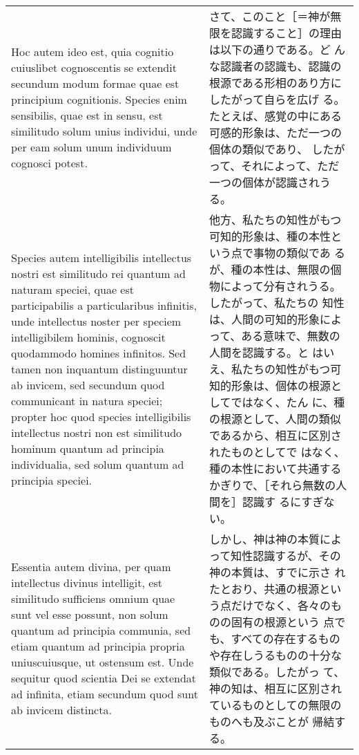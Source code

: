 \documentclass[10pt]{jsarticle} %
\begin{document}
\begin{longtable}{p{21em}p{21em}}
\\


Hoc autem ideo est, quia cognitio cuiuslibet cognoscentis se extendit
secundum modum formae quae est principium cognitionis. Species enim
sensibilis, quae est in sensu, est similitudo solum unius individui,
unde per eam solum unum individuum cognosci potest.

&

さて、このこと［＝神が無限を認識すること］の理由は以下の通りである。ど
んな認識者の認識も、認識の根源である形相のあり方にしたがって自らを広げ
る。たとえば、感覚の中にある可感的形象は、ただ一つの個体の類似であり、
したがって、それによって、ただ一つの個体が認識されうる。

\\


Species autem intelligibilis intellectus nostri est similitudo rei
quantum ad naturam speciei, quae est participabilis a particularibus
infinitis, unde intellectus noster per speciem intelligibilem hominis,
cognoscit quodammodo homines infinitos. Sed tamen non inquantum
distinguuntur ab invicem, sed secundum quod communicant in natura
speciei; propter hoc quod species intelligibilis intellectus nostri
non est similitudo hominum quantum ad principia individualia, sed
solum quantum ad principia speciei.

&

他方、私たちの知性がもつ可知的形象は、種の本性という点で事物の類似であ
るが、種の本性は、無限の個物によって分有されうる。したがって、私たちの
知性は、人間の可知的形象によって、ある意味で、無数の人間を認識する。と
はいえ、私たちの知性がもつ可知的形象は、個体の根源としてではなく、たん
に、種の根源として、人間の類似であるから、相互に区別されたものとしてで
はなく、種の本性において共通するかぎりで、［それら無数の人間を］認識す
るにすぎない。

\\

Essentia autem divina, per quam intellectus divinus intelligit, est
similitudo sufficiens omnium quae sunt vel esse possunt, non solum
quantum ad principia communia, sed etiam quantum ad principia propria
uniuscuiusque, ut ostensum est. Unde sequitur quod scientia Dei se
extendat ad infinita, etiam secundum quod sunt ab invicem distincta.


&

しかし、神は神の本質によって知性認識するが、その神の本質は、すでに示さ
れたとおり、共通の根源という点だけでなく、各々のものの固有の根源という
点でも、すべての存在するものや存在しうるものの十分な類似である。したがっ
て、神の知は、相互に区別されているものとしての無限のものへも及ぶことが
帰結する。



\end{longtable}
\end{document}
